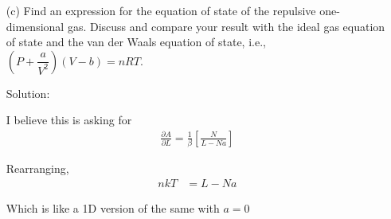 \begin{homeworkProblem}
\begin{enumerate}
\begin{callout}{Solution:}
                I'm biased towards using $\beta$, so I'll write this partial derivative in terms of it,
            \begin{align*}
                S = \ln Z - \beta \left( \frac{\partial \ln Z}{\partial \beta} \right) = - \frac{\partial A}{\partial T} = - \frac{\partial A}{\partial \beta} \frac{\partial \beta}{\partial T} = - \left( \frac{\partial A}{\partial \beta} \right) \frac{\partial}{\partial T} \left( \frac{1}{k T} \right) ={k\beta^{2}} \left( \frac{\partial A}{\partial \beta} \right)
            \end{align*}

            Great, now,
            \begin{align*}
                S &= k[N\ln (L-Na)-N\ln (\lambda)-\ln \left(N!\right)] \\ 
                \frac{S}{N} &= k[\ln (L-Na)- \frac{1}{2 \beta} - \frac{1}{N}\ln \left(N!\right)]
            \end{align*}

            For the ideal gas,
            \begin{align*}
            A &= \frac{k}{\beta} \left[\ln V - \frac{1}{N}\ln N! + \left( \frac{3}{2} \right) [\ln (2\pi m) - 2 \ln h - \ln \beta] \right]
            \end{align*}


            \end{callout}

        \item[(c)] Find an expression for the equation of state of the repulsive one-dimensional gas. Discuss and compare your result with the ideal gas equation of state and the van der Waals equation of state, i.e., $\left(P + \dfrac{a}{V^2}\right)(V - b) = nRT$.
            \begin{callout}{Solution:}

            I believe this is asking for 
            \begin{align*}
                \frac{\partial A}{\partial L} = \frac{1}{\beta}\left[\frac{N}{L-Na}\right]
            \end{align*}

            Rearranging, 
            \begin{align*}
                n k T &= L-Na
            \end{align*}

            Which is like a 1D version of the same with $a=0$

            \end{callout}
    \end{enumerate}
\end{homeworkProblem}


